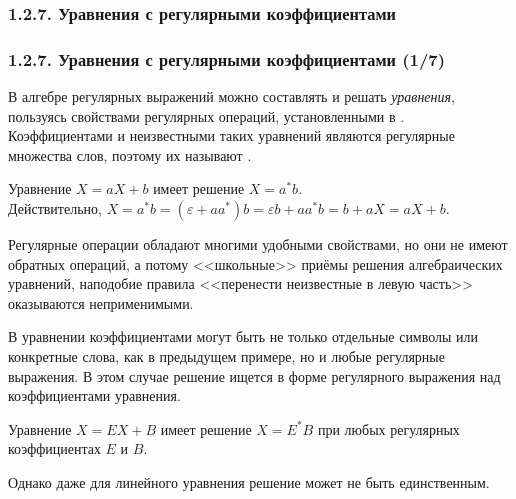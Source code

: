 
\subsubsection{1.2.7. Уравнения с регулярными коэффициентами}\label{1.2.7.}

\begin{frame}
\frametitle{1.2.7. Уравнения с регулярными коэффициентами (1/7)}
В алгебре регулярных выражений можно 
составлять и решать {\em уравнения}, пользуясь 
свойствами регулярных операций, установленными
в .
Коэффициентами и неизвестными таких
уравнений являются регулярные множества 
слов, поэтому их называют
.

\begin{example}
Уравнение $X=aX+b$ имеет решение $X=a^*b$.\\
Действительно, $X=a^*b=(\varepsilon+aa^*)b
=\varepsilon b +aa^*b = b+aX=aX+b$.
\end{example}

\begin{digress}
Регулярные операции обладают многими 
удобными свойствами, но они не имеют
обратных операций, 
а потому <<школьные>> приёмы
решения алгебраических уравнений,
наподобие правила 
<<перенести неизвестные в левую часть>>
оказываются неприменимыми.
\end{digress}

В уравнении коэффициентами могут 
быть не только отдельные символы или конкретные слова,
как в предыдущем примере, 
но и любые регулярные выражения.
В этом случае решение ищется в форме
регулярного выражения над коэффициентами
уравнения.

\begin{example}
Уравнение $X=EX+B$ имеет решение $X=E^*B$
при любых регулярных коэффициентах $E$ и $B$.
\end{example} 

Однако даже для линейного уравнения решение
может не быть единственным.
\end{frame}

